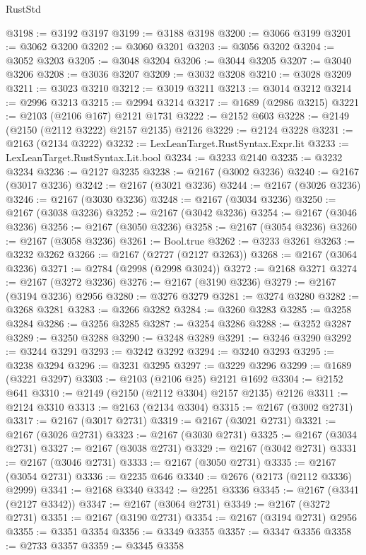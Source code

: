 \begin{lexlean}{RustStd}
\begin{coremodule}
{\begin{coremodule}
{{{{{{{{{{{{{{{{@3198 := @3192 @3197
@3199 := @3188 @3198
@3200 := @3066 @3199
@3201 := @3062 @3200
@3202 := @3060 @3201
@3203 := @3056 @3202
@3204 := @3052 @3203
@3205 := @3048 @3204
@3206 := @3044 @3205
@3207 := @3040 @3206
@3208 := @3036 @3207
@3209 := @3032 @3208
@3210 := @3028 @3209
@3211 := @3023 @3210
@3212 := @3019 @3211
@3213 := @3014 @3212
@3214 := @2996 @3213
@3215 := @2994 @3214
@3217 := @1689 (@2986 @3215)
@3221 := @2103 (@2106 @167) @2121 @1731
@3222 := @2152 @603
@3228 := @2149 (@2150 (@2112 @3222) @2157 @2135) @2126
@3229 := @2124 @3228
@3231 := @2163 (@2134 @3222)
@3232 := LexLeanTarget.RustSyntax.Expr.lit
@3233 := LexLeanTarget.RustSyntax.Lit.bool
@3234 := @3233 @2140
@3235 := @3232 @3234
@3236 := @2127 @3235
@3238 := @2167 (@3002 @3236)
@3240 := @2167 (@3017 @3236)
@3242 := @2167 (@3021 @3236)
@3244 := @2167 (@3026 @3236)
@3246 := @2167 (@3030 @3236)
@3248 := @2167 (@3034 @3236)
@3250 := @2167 (@3038 @3236)
@3252 := @2167 (@3042 @3236)
@3254 := @2167 (@3046 @3236)
@3256 := @2167 (@3050 @3236)
@3258 := @2167 (@3054 @3236)
@3260 := @2167 (@3058 @3236)
@3261 := Bool.true
@3262 := @3233 @3261
@3263 := @3232 @3262
@3266 := @2167 (@2727 (@2127 @3263))
@3268 := @2167 (@3064 @3236)
@3271 := @2784 (@2998 (@2998 @3024))
@3272 := @2168 @3271
@3274 := @2167 (@3272 @3236)
@3276 := @2167 (@3190 @3236)
@3279 := @2167 (@3194 @3236) @2956
@3280 := @3276 @3279
@3281 := @3274 @3280
@3282 := @3268 @3281
@3283 := @3266 @3282
@3284 := @3260 @3283
@3285 := @3258 @3284
@3286 := @3256 @3285
@3287 := @3254 @3286
@3288 := @3252 @3287
@3289 := @3250 @3288
@3290 := @3248 @3289
@3291 := @3246 @3290
@3292 := @3244 @3291
@3293 := @3242 @3292
@3294 := @3240 @3293
@3295 := @3238 @3294
@3296 := @3231 @3295
@3297 := @3229 @3296
@3299 := @1689 (@3221 @3297)
@3303 := @2103 (@2106 @25) @2121 @1692
@3304 := @2152 @641
@3310 := @2149 (@2150 (@2112 @3304) @2157 @2135) @2126
@3311 := @2124 @3310
@3313 := @2163 (@2134 @3304)
@3315 := @2167 (@3002 @2731)
@3317 := @2167 (@3017 @2731)
@3319 := @2167 (@3021 @2731)
@3321 := @2167 (@3026 @2731)
@3323 := @2167 (@3030 @2731)
@3325 := @2167 (@3034 @2731)
@3327 := @2167 (@3038 @2731)
@3329 := @2167 (@3042 @2731)
@3331 := @2167 (@3046 @2731)
@3333 := @2167 (@3050 @2731)
@3335 := @2167 (@3054 @2731)
@3336 := @2235 @646
@3340 := @2676 (@2173 (@2112 @3336) @2999)
@3341 := @2168 @3340
@3342 := @2251 @3336
@3345 := @2167 (@3341 (@2127 @3342))
@3347 := @2167 (@3064 @2731)
@3349 := @2167 (@3272 @2731)
@3351 := @2167 (@3190 @2731)
@3354 := @2167 (@3194 @2731) @2956
@3355 := @3351 @3354
@3356 := @3349 @3355
@3357 := @3347 @3356
@3358 := @2733 @3357
@3359 := @3345 @3358
}}}}}}}}}}}}}}}}
\end{coremodule}}
\end{coremodule}
\end{lexlean}
